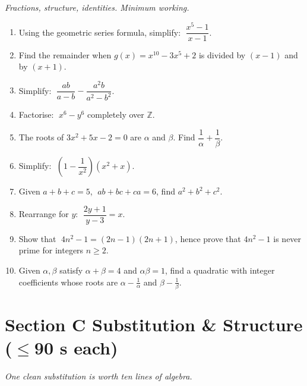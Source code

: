 \documentclass[11pt,a4paper]{article}
\begin{document}
\noindent\textit{Fractions, structure, identities. Minimum working.}

\begin{enumerate}

\item Using the geometric series formula, simplify: $\;\dfrac{x^5 - 1}{x - 1}$.

\item Find the remainder when $g(x) = x^{10} - 3x^5 + 2$ is divided by $(x-1)$
      and by $(x+1)$.

\item Simplify: $\;\dfrac{ab}{a-b} - \dfrac{a^2b}{a^2-b^2}$.

\item Factorise: $\;x^6 - y^6$ completely over $\mathbb{Z}$.

\item The roots of $3x^2 + 5x - 2 = 0$ are $\alpha$ and $\beta$.
      Find $\dfrac{1}{\alpha} + \dfrac{1}{\beta}$.

\item Simplify: $\;\left(1 - \dfrac{1}{x^2}\right)\!\left(x^2 + x\right)$.

\item Given $a + b + c = 5$, $\;ab + bc + ca = 6$, find $a^2 + b^2 + c^2$.

\item Rearrange for $y$: $\;\dfrac{2y+1}{y-3} = x$.

\item Show that $\;4n^2 - 1 = (2n-1)(2n+1)$, hence prove that $4n^2 - 1$
      is never prime for integers $n \geq 2$.

\item Given $\alpha, \beta$ satisfy $\alpha + \beta = 4$ and $\alpha\beta = 1$,
      find a quadratic with integer coefficients whose roots are
      $\alpha - \tfrac{1}{\alpha}$ and $\beta - \tfrac{1}{\beta}$.

\end{enumerate}

\section*{Section C \quad Substitution \& Structure \hfill{\normalfont\small($\leq$90 s each)}}

\noindent\textit{One clean substitution is worth ten lines of algebra.}
\end{document}

